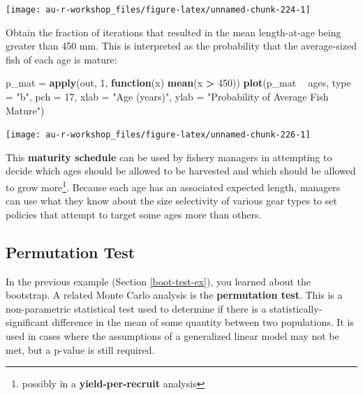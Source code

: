 \documentclass[]{book}
\newenvironment{Shaded}{\begin{snugshade}}{\end{snugshade}}
\newcommand{\KeywordTok}[1]{\textcolor[rgb]{0.13,0.29,0.53}{\textbf{#1}}}
\newcommand{\DataTypeTok}[1]{\textcolor[rgb]{0.13,0.29,0.53}{#1}}
\newcommand{\DecValTok}[1]{\textcolor[rgb]{0.00,0.00,0.81}{#1}}
\newcommand{\StringTok}[1]{\textcolor[rgb]{0.31,0.60,0.02}{#1}}
\newcommand{\ControlFlowTok}[1]{\textcolor[rgb]{0.13,0.29,0.53}{\textbf{#1}}}
\newcommand{\OperatorTok}[1]{\textcolor[rgb]{0.81,0.36,0.00}{\textbf{#1}}}
\newcommand{\NormalTok}[1]{#1}
\let\rmarkdownfootnote\footnote%
\def\footnote{\protect\rmarkdownfootnote}
\theoremstyle{definition}
\theoremstyle{definition}
\theoremstyle{definition}
\theoremstyle{remark}
\begin{document}
\begin{center}\texttt{[image: au-r-workshop\_files/figure-latex/unnamed-chunk-224-1]} \end{center}

Obtain the fraction of iterations that resulted in the mean
length-at-age being greater than 450 mm. This is interpreted as the
probability that the average-sized fish of each age is mature:

\begin{Shaded}
\begin{Highlighting}[]
\NormalTok{p_mat =}\StringTok{ }\KeywordTok{apply}\NormalTok{(out, }\DecValTok{1}\NormalTok{, }\ControlFlowTok{function}\NormalTok{(x) }\KeywordTok{mean}\NormalTok{(x }\OperatorTok{>}\StringTok{ }\DecValTok{450}\NormalTok{))}
\KeywordTok{plot}\NormalTok{(p_mat }\OperatorTok{~}\StringTok{ }\NormalTok{ages, }\DataTypeTok{type =} \StringTok{"b"}\NormalTok{, }\DataTypeTok{pch =} \DecValTok{17}\NormalTok{,}
     \DataTypeTok{xlab =} \StringTok{"Age (years)"}\NormalTok{, }\DataTypeTok{ylab =} \StringTok{"Probability of Average Fish Mature"}\NormalTok{)}
\end{Highlighting}
\end{Shaded}

\begin{center}\texttt{[image: au-r-workshop\_files/figure-latex/unnamed-chunk-226-1]} \end{center}

This \textbf{maturity schedule} can be used by fishery managers in
attempting to decide which ages should be allowed to be harvested and
which should be allowed to grow more\footnote{possibly in a
  \textbf{yield-per-recruit} analysis}. Because each age has an
associated expected length, managers can use what they know about the
size selectivity of various gear types to set policies that attempt to
target some ages more than others.

\subsection{Permutation Test}\label{perm-test-ex}

In the previous example (Section \ref{boot-test-ex}), you learned about
the bootstrap. A related Monte Carlo analysis is the \textbf{permutation
test}. This is a non-parametric statistical test used to determine if
there is a statistically-significant difference in the mean of some
quantity between two populations. It is used in cases where the
assumptions of a generalized linear model may not be met, but a p-value
is still required.
\end{document}
